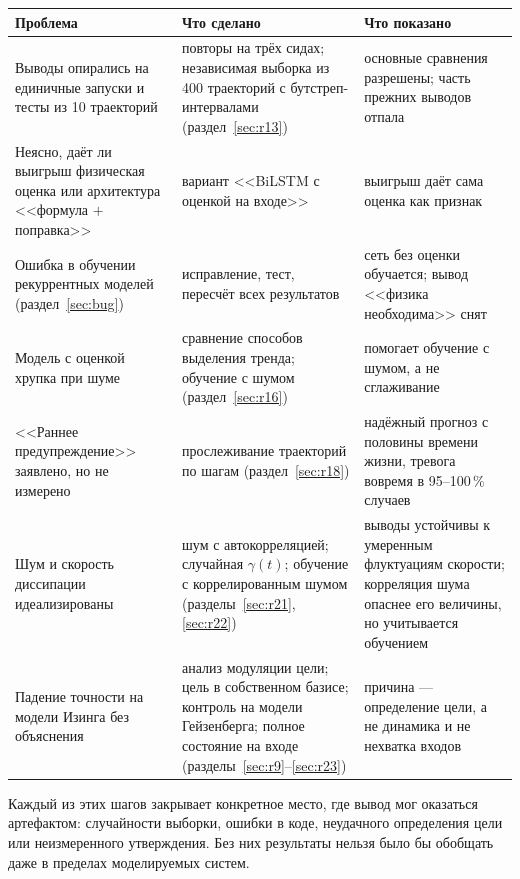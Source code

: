 \documentclass[12pt,a4paper]{report}
\numberwithin{equation}{chapter}
\begin{document}
\begin{center}\small
\begin{longtable}{@{}>{\raggedright\arraybackslash}p{4.6cm}>{\raggedright\arraybackslash}p{5cm}>{\raggedright\arraybackslash}p{5cm}@{}}
\toprule
Проблема & Что сделано & Что показано \\
\midrule
\endhead
Выводы опирались на единичные запуски и тесты из 10 траекторий &
повторы на трёх сидах; независимая выборка из 400 траекторий с
бутстреп-интервалами (раздел~\ref{sec:r13}) & основные сравнения
разрешены; часть прежних выводов отпала \\
Неясно, даёт ли выигрыш физическая оценка или архитектура <<формула $+$
поправка>> & вариант <<BiLSTM с оценкой на входе>> & выигрыш даёт сама
оценка как признак \\
Ошибка в обучении рекуррентных моделей (раздел~\ref{sec:bug}) & исправление,
тест, пересчёт всех результатов & сеть без оценки обучается; вывод
<<физика необходима>> снят \\
Модель с оценкой хрупка при шуме & сравнение способов выделения тренда;
обучение с шумом (раздел~\ref{sec:r16}) & помогает обучение с шумом, а не
сглаживание \\
<<Раннее предупреждение>> заявлено, но не измерено & прослеживание
траекторий по шагам (раздел~\ref{sec:r18}) & надёжный прогноз с половины
времени жизни, тревога вовремя в 95--100\,\% случаев \\
Шум и скорость диссипации идеализированы & шум с автокорреляцией;
случайная $\gamma(t)$; обучение с коррелированным шумом
(разделы~\ref{sec:r21}, \ref{sec:r22}) & выводы устойчивы к умеренным
флуктуациям скорости; корреляция шума опаснее его величины, но
учитывается обучением \\
Падение точности на модели Изинга без объяснения & анализ модуляции цели;
цель в собственном базисе; контроль на модели Гейзенберга; полное
состояние на входе (разделы~\ref{sec:r9}--\ref{sec:r23}) & причина ---
определение цели, а не динамика и не нехватка входов \\
\bottomrule
\end{longtable}
\end{center}

Каждый из этих шагов закрывает конкретное место, где вывод мог оказаться
артефактом: случайности выборки, ошибки в коде, неудачного определения
цели или неизмеренного утверждения. Без них результаты нельзя было бы
обобщать даже в пределах моделируемых систем.

\end{document}
